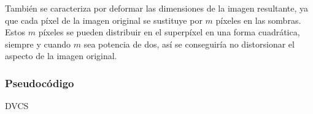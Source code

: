 También se caracteriza por deformar las dimensiones de la imagen resultante, ya
que cada píxel de la imagen original se sustituye por $m$ píxeles en las
sombras. Estos $m$ píxeles se pueden distribuir en el superpíxel en una forma
cuadrática, siempre y cuando $m$ sea potencia de dos, así se conseguiría no
distorsionar el aspecto de la imagen original.

\subsubsection{Pseudocódigo}
\begin{algorithm}[H]

	\Return{$[S_1,S_2,\cdots,S_N]$}
	\caption{DVCS}
	\label{alg:DVCS}
\end{algorithm}
\newpage

